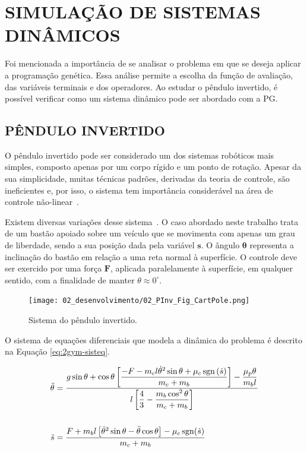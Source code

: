 \section{SIMULAÇÃO DE SISTEMAS DINÂMICOS}\label{sec:2gym-gymependinv}

Foi mencionada a importância de se analisar o problema em que se deseja aplicar a programação genética. Essa análise permite a escolha da função de avaliação, das variáveis terminais e dos operadores. Ao estudar o pêndulo invertido, é possível verificar como um sistema dinâmico pode ser abordado com a PG.

\subsection{PÊNDULO INVERTIDO}\label{ssec:2gym-sistdin}

O pêndulo invertido pode ser considerado um dos sistemas robóticos mais simples, composto apenas por um corpo rígido e um ponto de rotação. Apesar da sua simplicidade, muitas técnicas padrões, derivadas da teoria de controle, são ineficientes e, por isso, o sistema tem importância considerável na área de controle não-linear~\cite{olfa13PendInv}.

Existem diversas variações desse sistema~\cite{wang11PidIp}. O caso abordado neste trabalho trata de um bastão apoiado sobre um veículo que se movimenta com apenas um grau de liberdade, sendo a sua posição dada pela variável $\mathbf{s}$. O ângulo $\mathbf{\theta}$ representa a inclinação do bastão em relação a uma reta normal à superfície. O controle deve ser exercido por uma força $\mathbf{F}$, aplicada paralelamente à superfície, em qualquer sentido, com a finalidade de manter $\theta\approx 0^{\circ}$.

\begin{figure}[!h]
\centering
\texttt{[image: 02\_desenvolvimento/02\_PInv\_Fig\_CartPole.png]}
\caption{Sistema do pêndulo invertido.}\label{fig:2gym-cartpole}
\end{figure}

O sistema de equações diferenciais que modela a dinâmica do problema é descrito na Equação \ref{eq:2gym-sisteq}.

\begin{align}\label{eq:2gym-sisteq}
\ddot{\theta} &= \dfrac{g\sin\theta+\cos\theta\left[
\dfrac{-F-m_cl\dot{\theta}^2\sin\theta+\mu_c\sign{(\dot s)}}{m_c+m_b}\right] - \dfrac{\mu_p\theta}{m_bl}}
{l
\left[\dfrac{4}{3} - \dfrac{m_b\cos^2\theta}{m_c+m_b}
\right]}\nonumber\\\\
\ddot{s} &= \dfrac {F+m_bl\left[ \dot{\theta}^2\sin\theta-\ddot\theta\cos\theta \right]
-\mu_c\sign(\dot s)}
{m_c+m_b}\nonumber
\end{align}

